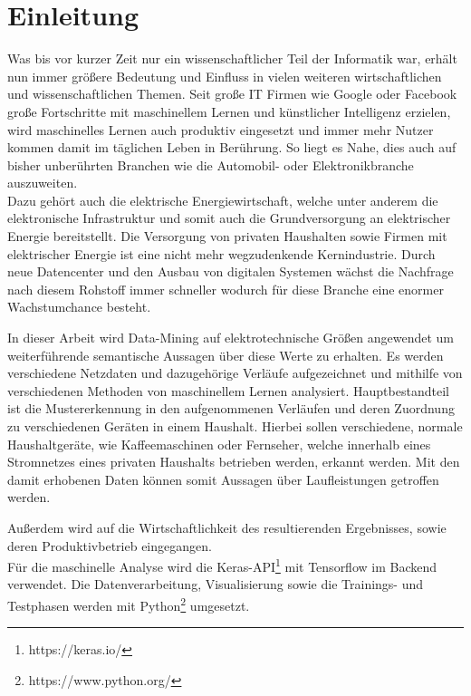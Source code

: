 \chapter{Einleitung}

    Was bis vor kurzer Zeit nur ein wissenschaftlicher Teil der Informatik war, erhält nun immer größere Bedeutung und Einfluss in vielen weiteren wirtschaftlichen und wissenschaftlichen Themen. 
    Seit große IT Firmen wie Google oder Facebook große Fortschritte mit maschinellem Lernen und künstlicher Intelligenz erzielen, wird maschinelles Lernen auch produktiv eingesetzt und immer mehr Nutzer kommen damit im täglichen Leben in Berührung.
    So liegt es Nahe, dies auch auf bisher unberührten Branchen wie die Automobil- oder Elektronikbranche auszuweiten.\\
    \newline
    Dazu gehört auch die elektrische Energiewirtschaft, welche unter anderem die elektronische Infrastruktur und somit auch die Grundversorgung an elektrischer Energie bereitstellt.
    Die Versorgung von privaten Haushalten sowie Firmen mit elektrischer Energie ist eine nicht mehr wegzudenkende Kernindustrie.
    Durch neue Datencenter und den Ausbau von digitalen Systemen wächst die Nachfrage nach diesem Rohstoff immer schneller wodurch für diese Branche eine enormer Wachstumchance besteht.
    \newline

    In dieser Arbeit wird Data-Mining auf elektrotechnische Größen angewendet um weiterführende semantische Aussagen über diese Werte zu erhalten. 
    Es werden verschiedene Netzdaten und dazugehörige Verläufe aufgezeichnet und mithilfe von verschiedenen Methoden von maschinellem Lernen analysiert.
    Hauptbestandteil ist die Mustererkennung in den aufgenommenen Verläufen und deren Zuordnung zu verschiedenen Geräten in einem Haushalt. 
    Hierbei sollen verschiedene, normale Haushaltgeräte, wie Kaffeemaschinen oder Fernseher, welche innerhalb eines Stromnetzes eines privaten Haushalts betrieben werden, erkannt werden.
    Mit den damit erhobenen Daten können somit Aussagen über Laufleistungen getroffen werden.
    \newline
    
    Außerdem wird auf die Wirtschaftlichkeit des resultierenden Ergebnisses, sowie deren Produktivbetrieb eingegangen.\\
    \newline
    Für die maschinelle Analyse wird die Keras-API\footnote{https://keras.io/} mit Tensorflow im Backend verwendet.
    Die Datenverarbeitung, Visualisierung sowie die Trainings- und Testphasen werden mit Python\footnote{https://www.python.org/} umgesetzt.
